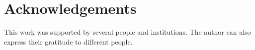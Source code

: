 \chapter*{Acknowledgements}\label{acknowledgements}
\pagestyle{MyThesisStyle}

{\sloppy This work was supported by several people and institutions. The author can also express their gratitude to different people.}
